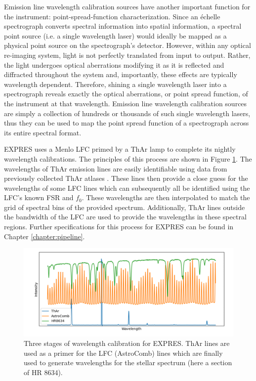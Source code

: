 Emission line wavelength calibration sources have another important function for the instrument: point-spread-function characterization. Since an \'echelle spectrograph converts spectral information into spatial information, a spectral point source (i.e. a single wavelength laser) would ideally be mapped as a physical point source on the spectrograph's detector. However, within any optical re-imaging system, light is not perfectly translated from input to output. Rather, the light undergoes optical aberrations modifying it as it is reflected and diffracted throughout the system and, importantly, these effects are typically wavelength dependent. Therefore, shining a single wavelength laser into a spectrograph reveals exactly the optical aberrations, or point spread function, of the instrument at that wavelength. Emission line wavelength calibration sources are simply a collection of hundreds or thousands of such single wavelength lasers, thus they can be used to map the point spread function of a spectrograph across its entire spectral format.

EXPRES uses a Menlo LFC primed by a ThAr lamp to complete its nightly wavelength calibrations. The principles of this process are shown in Figure \ref{fig:calibration}. The wavelengths of ThAr emission lines are easily identifiable using data from previously collected ThAr atlases \citep{palmer_atlas_1983, redman_spectrum_2014}. These lines then provide a close guess for the wavelengths of some LFC lines which can subsequently all be identified using the LFC's known FSR and $f_0$. These wavelengths are then interpolated to match the grid of spectral bins of the provided spectrum. Additionally, ThAr lines outside the bandwidth of the LFC are used to provide the wavelengths in these spectral regions. Further specifications for this process for EXPRES can be found in Chapter \ref{chapter:pipeline}.

\begin{figure}
    \centering
    \includegraphics[width=\textwidth]{figures-1/calibration.png}
    \caption[EXPRES Wavelength Calibration]{Three stages of wavelength calibration for EXPRES. ThAr lines are used as a primer for the LFC (AstroComb) lines which are finally used to generate wavelengths for the stellar spectrum (here a section of HR 8634).}
    \label{fig:calibration}
\end{figure}

